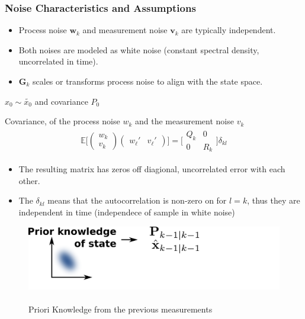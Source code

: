 \documentclass[aspectratio=169,hyperref={pdfpagelabels=false}]{beamer}
\begin{document}
  
  \begin{frame}
  \frametitle{Noise Characteristics and Assumptions}
      \begin{itemize}
          \item Process noise \(\mathbf{w}_k\) and measurement noise \(\mathbf{v}_k\) are typically independent.
          \item Both noises are modeled as white noise (constant spectral density, uncorrelated in time).
          \item \(\mathbf{G}_k\) scales or transforms process noise to align with the state space.
      \end{itemize}
  \end{frame}

\begin{frame}{}
  $x_0 \sim \tilde{x_0}$ and covariance $P_0$
  \begin{block}{Covariance, of the process noise $w_k$ and the measurement noise $v_k$}
    \begin{align*}
      \mathbb{E}\Biggl [
        \begin{pmatrix}
        w_k \\
        v_k
        \end{pmatrix}
        \begin{pmatrix}
          w_{\ell}' & v_{\ell}'
          \end{pmatrix}
        \Biggr ] = \Biggl [ \begin{matrix}
          Q_k & 0\\
          0 & R_k 
          \end{matrix} \Biggr ] \delta_{kl}
    \end{align*}
  \end{block}
\begin{itemize}
  \item The resulting matrix has zeros off diagional, uncorrelated error with each other.
  \item The $\delta_{kl}$ means that the autocorrelation is non-zero on for $l=k$, thus they are independent in time (independece of sample in white noise)
\end{itemize}
\end{frame}

\begin{frame}
  \begin{figure}
    \centering
    \includegraphics[width=0.9\linewidth]{img/3.pdf}
    \caption{\\ Priori Knowledge from the previous measurements}
  \end{figure}
\end{frame}
\end{document}
